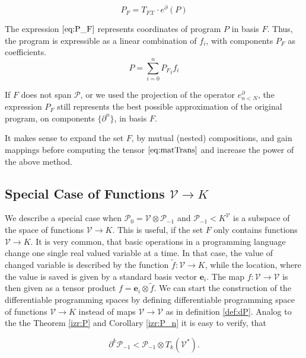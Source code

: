 \documentclass[11pt]{article}
\newcommand{\VV}{\mathcal{V}}
\newcommand{\e}{\mathbf{e}}
\newcommand{\X}{\mathcal{X}}
\newcommand{\dP}{\mathcal{P}}
\newcommand{\D}{\partial}
\begin{document}
  \begin{equation}\label{eq:P_F}
  	P_F=T_{F\X}\cdot e^\D(P)
  \end{equation}
  
  The expression $\eqref{eq:P_F}$ represents coordinates of program $P$ in basis $F$. Thus, the program is expressible as a linear combination of $f_i$, with components $P_F$ as coefficients.
  \begin{equation*}
  P=\sum\limits_{i=0}^{n}{P_F}_if_i
  \end{equation*}
  
  If $F$ does not span $\dP$, or we used the projection of the operator $e^\D_{n<N}$, the expression $P_F$ still represents the best possible approximation of the original program, on components $\{\D^n\}$, in basis $F$.
  \begin{remark}
  It makes sense to expand the set $F$, by mutual (nested) compositions, and
  gain mappings before
  computing the tensor $\eqref{eq:matTrans}$ and increase the power of the above
  method.
\end{remark}
\subsection{Special Case of Functions $\VV\to K$}
We describe a special case when $\dP_0=\VV\otimes\dP_{-1}$ and
$\dP_{-1}<K^\VV$ is a subspace of the space of functions $\VV\to K$. This is
useful, if the set $F$ only contains functions $\VV\to K$. It is
very common, that basic operations in a programming language change one single
real valued variable at a time. In that case, the value of changed variable is
described by the function $\tilde{f}:\VV\to K$, while the location, where the
value is saved is given by a standard basis vector $\e_i$. The map $f:\VV\to \VV$
is then given as a tensor product $f=\e_i\otimes \tilde{f}$. We can start the
construction of the differentiable programming spaces by defining differentiable
programming space of functions $\VV\to K$ instead of maps $\VV\to \VV$ as in
definition \ref{def:dP}.  Analog to the the Theorem \ref{izr:P} and Corollary \ref{izr:P_n}
it is easy to verify, that

\begin{equation}
  \label{eq:tilda_dP}
  \D^k\dP_{-1} < \dP_{-1}\otimes T_k(\VV^*).
\end{equation}
\end{document}
